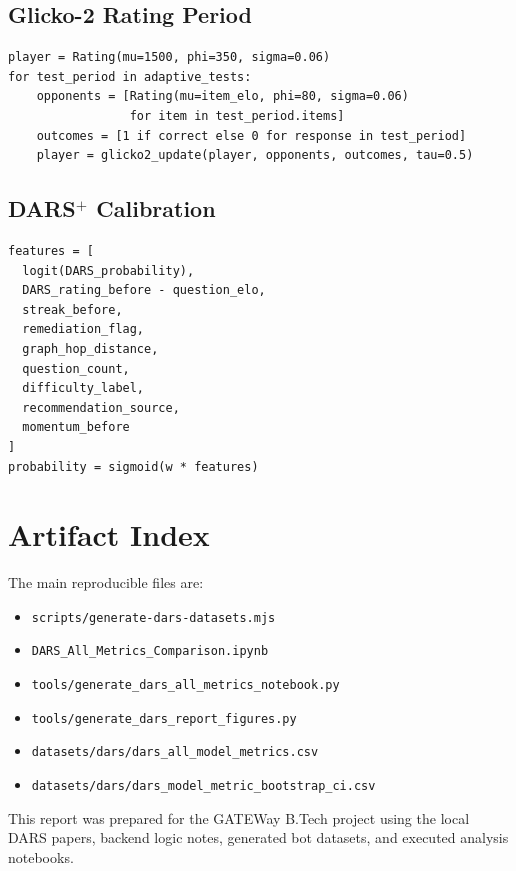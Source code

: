 \documentclass[sigconf,nonacm]{acmart}
\begin{document}
\subsection{Glicko-2 Rating Period}
\begin{verbatim}
player = Rating(mu=1500, phi=350, sigma=0.06)
for test_period in adaptive_tests:
    opponents = [Rating(mu=item_elo, phi=80, sigma=0.06)
                 for item in test_period.items]
    outcomes = [1 if correct else 0 for response in test_period]
    player = glicko2_update(player, opponents, outcomes, tau=0.5)
\end{verbatim}

\subsection{DARS$^+$ Calibration}
\begin{verbatim}
features = [
  logit(DARS_probability),
  DARS_rating_before - question_elo,
  streak_before,
  remediation_flag,
  graph_hop_distance,
  question_count,
  difficulty_label,
  recommendation_source,
  momentum_before
]
probability = sigmoid(w * features)
\end{verbatim}

\section{Artifact Index}
The main reproducible files are:
\begin{itemize}[leftmargin=*]
  \item \texttt{scripts/generate-dars-datasets.mjs}
  \item \texttt{DARS\_All\_Metrics\_Comparison.ipynb}
  \item \texttt{tools/generate\_dars\_all\_metrics\_notebook.py}
  \item \texttt{tools/generate\_dars\_report\_figures.py}
  \item \texttt{datasets/dars/dars\_all\_model\_metrics.csv}
  \item \texttt{datasets/dars/dars\_model\_metric\_bootstrap\_ci.csv}
\end{itemize}

\begin{acks}
This report was prepared for the GATEWay B.Tech project using the local DARS papers, backend logic notes, generated bot datasets, and executed analysis notebooks.
\end{acks}
\end{document}
